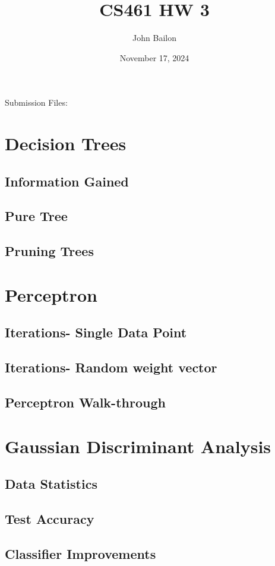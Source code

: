 \documentclass{article}
\title{CS461 HW 3}
\author{John Bailon}
\date{November 17, 2024}
\begin{document}
\maketitle

\noindent
Submission Files:

\section{Decision Trees}
\subsection{Information Gained}
\subsection{Pure Tree}
\subsection{Pruning Trees}

\section{Perceptron}
\subsection{Iterations- Single Data Point}
\subsection{Iterations- Random weight vector}
\subsection{Perceptron Walk-through}

\section{Gaussian Discriminant Analysis}
\subsection{Data Statistics}
\subsection{Test Accuracy}
\subsection{Classifier Improvements}
\end{document}
